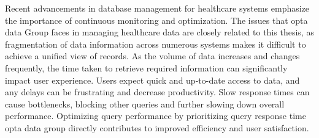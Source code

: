

Recent advancements in database management for healthcare systems emphasize the importance of continuous monitoring and optimization. The issues that opta data Group faces in managing healthcare data are closely related to this thesis, as fragmentation of data information across numerous systems makes it difficult to achieve a unified view of records. As the volume of data increases and changes frequently, the time taken to retrieve required information can significantly impact user experience. Users expect quick and up-to-date access to data, and any delays can be frustrating and decrease productivity. Slow response times can cause bottlenecks, blocking other queries and further slowing down overall performance. Optimizing query performance by prioritizing query response time opta data group directly contributes to improved efficiency and user satisfaction.
\clearpage

